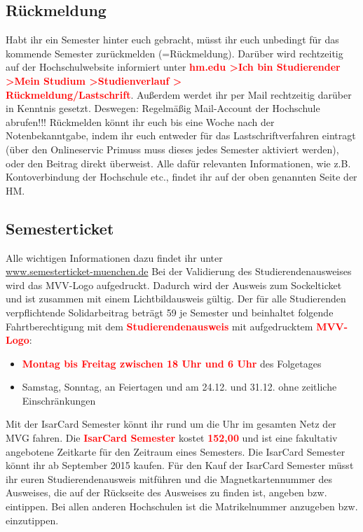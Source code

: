 \subsection{Rückmeldung}

Habt ihr ein Semester hinter euch gebracht, müsst ihr euch unbedingt für das kommende Semester zurückmelden (=Rückmeldung). Darüber wird rechtzeitig auf der Hochschulwebsite informiert unter \textcolor{red}{\textbf{hm.edu \textgreater Ich bin Studierender \textgreater Mein Studium \textgreater Studienverlauf \textgreater\\ Rückmeldung/Lastschrift}}. Außerdem werdet ihr per Mail rechtzeitig darüber in Kenntnis gesetzt. Deswegen: Regelmäßig Mail-Account der Hochschule abrufen!!! Rückmelden könnt ihr euch bis eine Woche nach der Notenbekanntgabe, indem ihr euch entweder für das Lastschriftverfahren eintragt (über den Onlineservic Primuss muss dieses jedes Semester aktiviert werden), oder den Beitrag direkt überweist.\doublebreak
Alle dafür relevanten Informationen, wie z.B. Kontoverbindung der Hochschule etc., findet ihr auf der oben genannten Seite der HM.


\subsection{Semesterticket}

Alle wichtigen Informationen dazu findet ihr unter\\
\url{www.semesterticket-muenchen.de}\doublebreak
Bei der Validierung des Studierendenausweises wird das MVV-Logo aufgedruckt. Dadurch wird der Ausweis zum Sockelticket und ist zusammen mit einem Lichtbildausweis gültig. Der für alle Studierenden verpflichtende Solidarbeitrag beträgt 59 \texteuro je Semester und beinhaltet folgende Fahrtberechtigung mit dem \textcolor{red}{\textbf{Studierendenausweis}} mit aufgedrucktem \textcolor{red}{\textbf{MVV-Logo}}:
\begin{itemize}
	\item \textcolor{red}{\textbf{Montag bis Freitag zwischen 18 Uhr und 6 Uhr}} des Folgetages
	\item Samstag, Sonntag, an Feiertagen und am 24.12. und 31.12. ohne
	zeitliche Einschränkungen
\end{itemize}
Mit der IsarCard Semester könnt ihr rund um die Uhr im gesamten Netz der MVG fahren. Die \textcolor{red}{\textbf{IsarCard Semester}} kostet \textcolor{red}{\textbf{152,00}} \texteuro und ist eine fakultativ angebotene Zeitkarte für den Zeitraum eines Semesters. Die IsarCard Semester könnt ihr ab September 2015 kaufen. Für den Kauf der IsarCard Semester müsst ihr euren Studierendenausweis mitführen und die Magnetkartennummer des Ausweises, die auf der Rückseite des Ausweises zu finden ist, angeben bzw. eintippen. Bei allen anderen Hochschulen ist die Matrikelnummer anzugeben bzw. einzutippen.

